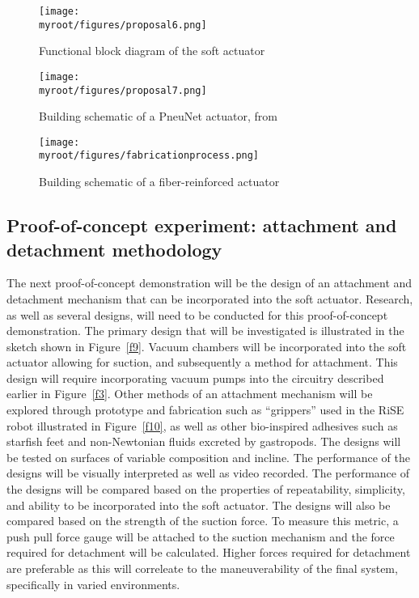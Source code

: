 \documentclass{IEEEtran}
\newcommand{\myroot}{../}
\begin{document}
\begin{figure}
\begin{center}
\texttt{[image: \\myroot/figures/proposal6.png]}
\end{center}
\caption{Functional block diagram of the soft actuator}
\label{f6}
\end{figure}

\begin{figure}
\begin{center}
\texttt{[image: \\myroot/figures/proposal7.png]}
\end{center}
\caption{Building schematic of a PneuNet actuator, from \cite{holland2014soft}}
\label{f7}
\end{figure}

\begin{figure}
\begin{center}
\texttt{[image: \\myroot/figures/fabricationprocess.png]}
\end{center}
\caption{Building schematic of a fiber-reinforced actuator \cite{holland2014soft}}
\label{f8}
\end{figure}

\subsection{Proof-of-concept experiment: attachment and detachment methodology}
The next proof-of-concept demonstration will be the design of an attachment and detachment mechanism that can be incorporated into the soft actuator.  Research, as well as several designs, will need to be conducted for this proof-of-concept demonstration.  The primary design that will be investigated is illustrated in the sketch shown in Figure~\ref{f9}.  Vacuum chambers will be incorporated into the soft actuator allowing for suction, and subsequently a method for attachment.  This design will require incorporating vacuum pumps into the circuitry described earlier in Figure~\ref{f3}.  Other methods of an attachment mechanism will be explored through prototype and fabrication such as ``grippers'' used in the RiSE robot illustrated in Figure~\ref{f10}, as well as other bio-inspired adhesives such as starfish feet and non-Newtonian fluids excreted by gastropods.  The designs will be tested on surfaces of variable composition and incline. The performance of the designs will be visually interpreted as well as video recorded.  The performance of the designs will be compared based on the properties of repeatability, simplicity, and ability to be incorporated into the soft actuator. The designs will also be compared based on the strength of the suction force. To measure this metric, a push pull force gauge will be attached to the suction mechanism and the force required for detachment will be calculated.  Higher forces required for detachment are preferable as this will correleate to the maneuverability of the final system, specifically in varied environments. 
\end{document}
